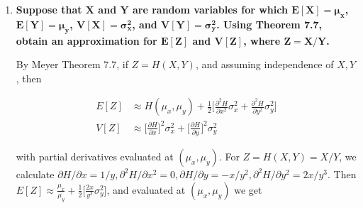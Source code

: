 \documentclass[10pt, oneside]{article}
\begin{document}
\begin{enumerate}[label=7.\arabic*]
\begin{enumerate}
	  \begin{align*}
	  g(x) &= \int^{2x}_0 \frac{1}{4} \ dy = \boxed{x/2, \quad 0 \leq x \leq 2} \\
	  h(y) &= \int^2_{y/2} \frac{1}{4} \ dx = \boxed{ \frac{4 - y}{8}, \quad 0 \leq y \leq 4 }
	  \end{align*}
	  
	  \newpage
	\item  \begin{tcolorbox}[
	  colback=Cerulean!5!white,
	  colframe=Cerulean!75!black]
	  \textbf{Evaluate $\bm{V[X]}$ and $\bm{V[Y]}$.}
	  \end{tcolorbox}
	  
	  We calculate
	  
	  \begin{align*}
	  E[X] &= \int^2_0 \frac{x^2}{2} \ dx = 4/3 \\
	  V[X] &= \int^2_0 (x - 4/3)^2 \frac{x}{2} \ dx = \boxed{2/9} \\
	  E[Y] &= \int^4_0 y \Big( \frac{4-y}{8} \Big) \ dy = 4/3 \\
	  V[Y] &= \int^4_0 (y - 4/3)^2 \Big( \frac{4-y}{8} \Big) \ dy = \boxed{4/9}
	  \end{align*}
	\end{enumerate}

\item  \begin{tcolorbox}[
  colback=Cerulean!5!white,
  colframe=Cerulean!75!black]
  \textbf{Suppose that $\bm{X}$ and $\bm{Y}$ are random variables for which $\bm{E[X] = \mu_x}$, $\bm{E[Y] = \mu_y}$, $\bm{V[X] = \sigma^2_x}$, and $\bm{V[Y] = \sigma^2_y}$. Using Theorem 7.7, obtain an approximation for $\bm{E[Z]}$ and $\bm{V[Z]}$, where $\bm{Z = X/Y}$.}
  \end{tcolorbox}
  
  By Meyer Theorem 7.7, if $Z = H(X,Y)$, and assuming independence of $X,Y$, then
  
  \begin{align*}
  E[Z] &\approx H(\mu_x, \mu_y) + \frac{1}{2} \Big[ \frac{\partial^2 H}{\partial x^2} \sigma^2_x + \frac{\partial^2 H}{\partial y^2} \sigma^2_y \Big] \\
  V[Z] &\approx \Big[ \frac{\partial H}{\partial x} \Big]^2 \sigma^2_x + \Big[ \frac{\partial H}{\partial y} \Big]^2 \sigma^2_y
  \end{align*}
  
  with partial derivatives evaluated at $(\mu_x, \mu_y)$. For $Z = H(X,Y) = X/Y$, we calculate $\partial H / \partial x = 1/y, \partial^2 H / \partial x^2 = 0, \partial H / \partial y = -x / y^2, \partial^2 H / \partial y^2 = 2x / y^3$. Then $E[Z] \approx \frac{\mu_x}{\mu_y} + \frac{1}{2} \Big[ \frac{2x}{y^3} \sigma^2_y \Big]$, and evaluated at $(\mu_x, \mu_y)$ we get
  

\end{enumerate}
\end{document}

